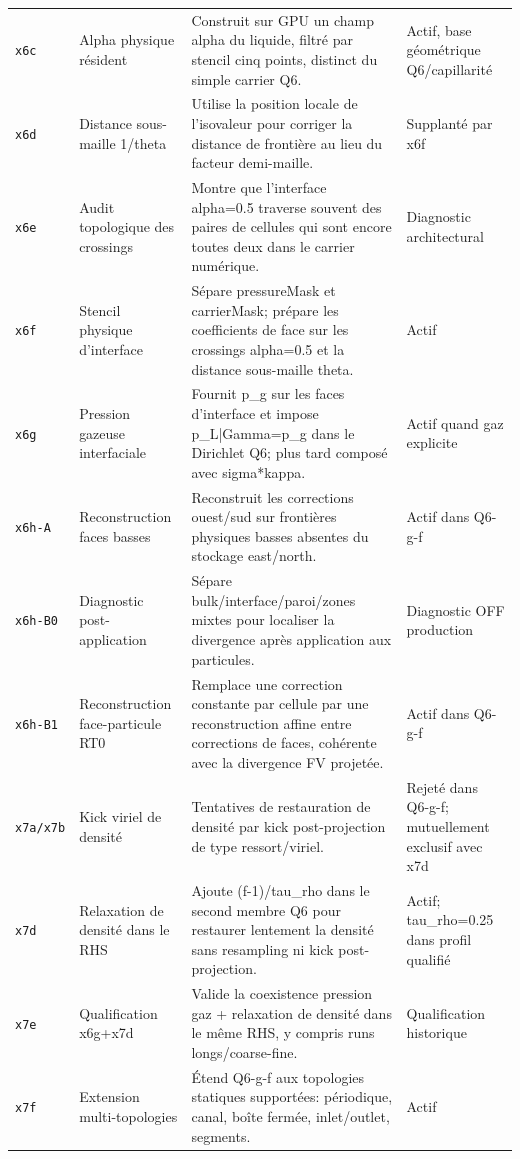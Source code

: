 \documentclass[a4paper,9pt]{article}
\begin{document}
\begin{landscape}
\begin{longtable}{L{2.35cm} L{5.3cm} L{13.25cm} L{4.75cm}}
\texttt{x6c} & Alpha physique résident & Construit sur GPU un champ alpha du liquide, filtré par stencil cinq points, distinct du simple carrier Q6. & Actif, base géométrique Q6/capillarité \\
\texttt{x6d} & Distance sous-maille 1/theta & Utilise la position locale de l'isovaleur pour corriger la distance de frontière au lieu du facteur demi-maille. & Supplanté par x6f \\
\texttt{x6e} & Audit topologique des crossings & Montre que l'interface alpha=0.5 traverse souvent des paires de cellules qui sont encore toutes deux dans le carrier numérique. & Diagnostic architectural \\
\texttt{x6f} & Stencil physique d'interface & Sépare pressureMask et carrierMask; prépare les coefficients de face sur les crossings alpha=0.5 et la distance sous-maille theta. & Actif \\
\texttt{x6g} & Pression gazeuse interfaciale & Fournit p\_g sur les faces d'interface et impose p\_L|Gamma=p\_g dans le Dirichlet Q6; plus tard composé avec sigma*kappa. & Actif quand gaz explicite \\
\texttt{x6h-A} & Reconstruction faces basses & Reconstruit les corrections ouest/sud sur frontières physiques basses absentes du stockage east/north. & Actif dans Q6-g-f \\
\texttt{x6h-B0} & Diagnostic post-application & Sépare bulk/interface/paroi/zones mixtes pour localiser la divergence après application aux particules. & Diagnostic OFF production \\
\texttt{x6h-B1} & Reconstruction face-particule RT0 & Remplace une correction constante par cellule par une reconstruction affine entre corrections de faces, cohérente avec la divergence FV projetée. & Actif dans Q6-g-f \\
\texttt{x7a/x7b} & Kick viriel de densité & Tentatives de restauration de densité par kick post-projection de type ressort/viriel. & Rejeté dans Q6-g-f; mutuellement exclusif avec x7d \\
\texttt{x7d} & Relaxation de densité dans le RHS & Ajoute (f-1)/tau\_rho dans le second membre Q6 pour restaurer lentement la densité sans resampling ni kick post-projection. & Actif; tau\_rho=0.25 dans profil qualifié \\
\texttt{x7e} & Qualification x6g+x7d & Valide la coexistence pression gaz + relaxation de densité dans le même RHS, y compris runs longs/coarse-fine. & Qualification historique \\
\texttt{x7f} & Extension multi-topologies & Étend Q6-g-f aux topologies statiques supportées: périodique, canal, boîte fermée, inlet/outlet, segments. & Actif \\

\end{longtable}
\end{landscape}
\end{document}
